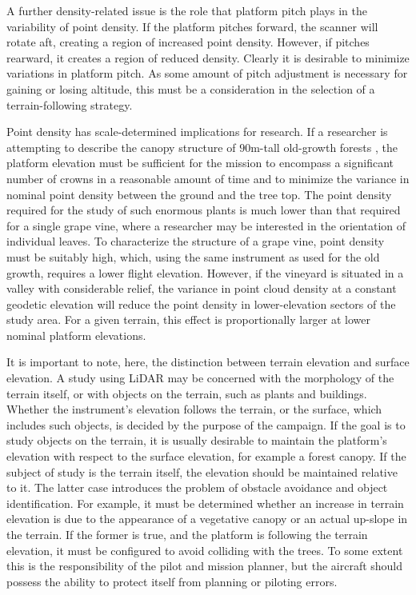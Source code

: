 \documentclass[10pt]{article}
\begin{document}
A further density-related issue is the role that platform pitch plays in the variability of point density. If the platform pitches forward, the scanner will rotate aft, creating a region of increased point density. However, if pitches rearward, it creates a region of reduced density. Clearly it is desirable to minimize variations in platform pitch. As some amount of pitch adjustment is necessary for gaining or losing altitude, this must be a consideration in the selection of a terrain-following strategy.

Point density has scale-determined implications for research. If a researcher is attempting to describe the canopy structure of $90\si{\m}$-tall old-growth forests \cite{Niemann2007,Niemann2012}, the platform elevation must be sufficient for the mission to encompass a significant number of crowns in a reasonable amount of time and to  minimize the variance in nominal point density between the ground and the tree top. The point density required for the study of such enormous plants is much lower than that required for a single grape vine, where a researcher may be interested in the orientation of individual leaves. To characterize the structure of a grape vine, point density must be suitably high, which, using the same instrument as used for the old growth, requires a lower flight elevation. However, if the vineyard is situated in a valley with considerable relief, the variance in point cloud density at a constant geodetic elevation will reduce the point density in lower-elevation sectors of the study area. For a given terrain, this effect is proportionally larger at lower nominal platform elevations.

It is important to note, here, the distinction between terrain elevation and surface elevation. A study using LiDAR may be concerned with the morphology of the terrain itself, or with objects on the terrain, such as plants and buildings. Whether the instrument's elevation follows the terrain, or the surface, which includes such objects, is decided by the purpose of the campaign. If the goal is to study objects on the terrain, it is usually desirable to maintain the platform's elevation with respect to the surface elevation, for example a forest canopy. If the subject of study is the terrain itself, the elevation should be maintained relative to it. The latter case introduces the problem of obstacle avoidance and object identification. For example, it must be determined whether an increase in terrain elevation is due to the appearance of a vegetative canopy or an actual up-slope in the terrain. If the former is true, and the platform is following the terrain elevation, it must be configured to avoid colliding with the trees. To some extent this is the responsibility of the pilot and mission planner, but the aircraft should possess the ability to protect itself from planning or piloting errors.
\end{document}
